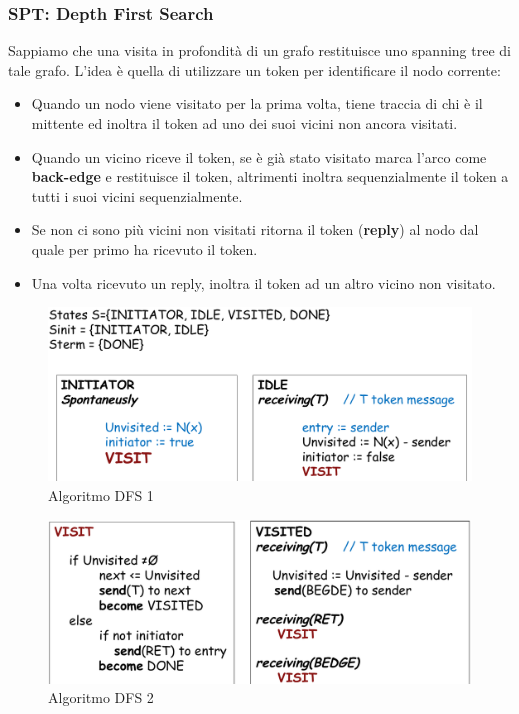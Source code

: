 \documentclass[12pt]{article}
\begin{document}
		\subsubsection{SPT: Depth First Search}
			Sappiamo che una visita in profondità di un grafo restituisce uno spanning tree di tale grafo.
			L'idea è quella di utilizzare un token per identificare il nodo corrente: 
			\begin{itemize}
				\item Quando un nodo viene visitato per la prima volta, tiene traccia di chi è il mittente ed inoltra il token ad uno dei suoi vicini non ancora visitati.
				\item Quando un vicino riceve il token, se è già stato visitato marca l'arco come \textbf{back-edge} e restituisce il token, altrimenti inoltra sequenzialmente il token a tutti i suoi vicini sequenzialmente.
				\item Se non ci sono più vicini non visitati ritorna il token (\textbf{reply}) al nodo dal quale per primo ha ricevuto il token.
				\item Una volta ricevuto un reply, inoltra il token ad un altro vicino non visitato. 
			\end{itemize}
			\begin{figure}[h!]
				\centering
				\includegraphics[scale=0.3]{img/dfs.png}
				\caption{Algoritmo DFS 1}
			\end{figure}
			\begin{figure}[h!]
				\centering
				\includegraphics[scale=0.3]{img/dfs2.png}
				\caption{Algoritmo DFS 2}
			\end{figure}
		
\end{document}
